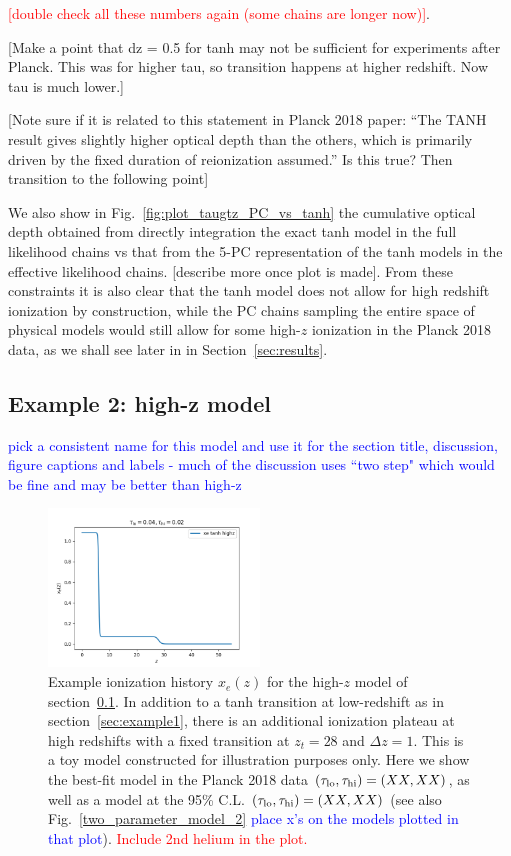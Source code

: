 \documentclass[prd,twocolumn,amsmath,amssymb,floatfix,superscriptaddress,nofootinbib]{revtex4-1}
\newcommand{\refsec}[1]{section~\ref{sec:#1}}
\newcommand{\tauhi}{\tau_{\rm hi}}
\newcommand{\taulo}{\tau_{\rm lo}}
\newcommand{\wh}[1]{\textcolor{blue}{#1}}
\newcommand{\ch}[1]{\textcolor{red}{#1}}
\begin{document}
\ch{[double check all these numbers again (some chains are longer now)]}.

[Make a point that dz = 0.5 for tanh may not be sufficient for experiments after Planck. This was for higher tau, so transition happens at higher redshift. Now tau is much lower.] 

[Note sure if it is related to this statement in Planck 2018 paper: ``The TANH result gives slightly higher optical  depth  than  the  others,  which  is  primarily driven  by  the  fixed  duration  of  reionization assumed.” Is this true? Then transition to the following point]


We also show in Fig.~\ref{fig:plot_taugtz_PC_vs_tanh} the cumulative optical depth obtained from directly integration the exact tanh model in the full likelihood chains vs that from the 5-PC representation of the tanh models in the effective likelihood chains. [describe more once plot is made]. From these constraints it is also clear that the tanh model does not allow for high redshift ionization by construction, while the PC chains sampling the entire space of physical models would still allow for some high-$z$ ionization in the Planck 2018 data, as we shall see later in in Section~\ref{sec:results}.

\subsection{Example 2: high-z model}
\label{sec:example2}

\wh{pick a consistent name for this model and use it for the section title, discussion, figure captions and labels - much of the discussion uses ``two step" which would be fine and may be better than high-z}

\begin{figure}
\includegraphics[width=0.5\textwidth]{results/cosmomc_kde/taulo_prior_test/plot_xez_taulo_0p04_tauhi_0p02.png}
\caption{Example ionization history $x_e(z)$ for the high-$z$ model of \refsec{example2}. In addition to a tanh transition at low-redshift as in \refsec{example1}, there is an additional ionization plateau at high redshifts with a fixed transition at $z_t = 28$ and $\Delta z = 1$. This is a toy model constructed for illustration purposes only. Here we show the best-fit model in the Planck 2018 data $(\taulo, \tauhi) = (XX, XX)$, as well as  a model at the 95\% C.L. $(\taulo, \tauhi) = (XX, XX)$ (see also Fig.~\ref{two_parameter_model_2}  \wh{place x's on the models plotted in that plot}). \ch{Include 2nd helium in the plot.}
}
\label{fig:two_step_model}
\end{figure}
\end{document}
